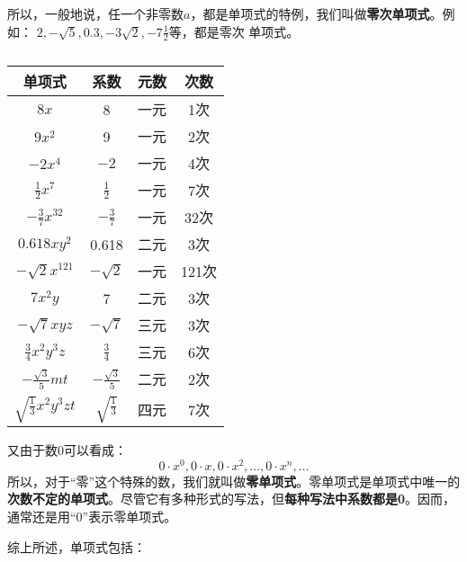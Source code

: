 所以，一般地说，任一个非零数$a$，都是单项式的特例，我们叫做\textbf{零次单项式}。例如：
$2,-\sqrt{5}, 0.3,-3\sqrt{2},-7\frac{1}{2}$等，都是零次
单项式。
\begin{table}
    \caption{}
    \begin{center}
        \begin{tabular}{cccc}
            \hline
            单项式&        系数& 元数&        次数 \\
            \hline
            $8x$& 8& 一元 & 1次\\
            $9x^2$& 9& 一元 & 2次\\
            $-2x^4$& $-2$& 一元 & 4次\\
            $\frac{1}{2}x^7$& $\frac{1}{2}$& 一元 & 7次\\
            $-\frac{3}{7}x^{32}$& $-\frac{3}{7}$& 一元 & 32次\\
            $0.618xy^2$& 0.618 & 二元& 3次  \\
            $-\sqrt{2}x^{121}$& $-\sqrt{2}$ & 一元& 121次     \\
             $7x^2y$ & 7 & 二元& 3次    \\
              $-\sqrt{7}xyz$ & $-\sqrt{7}$ & 三元& 3次     \\
              $\frac{3}{4}x^2y^3z$  & $\frac{3}{4}$ & 三元& 6次   \\
            $-\frac{\sqrt{3}}{5}mt$  & $-\frac{\sqrt{3}}{5}$ & 二元& 2次   \\
            $\sqrt{\frac{1}{3}}x^2y^3zt$  & $\sqrt{\frac{1}{3}}$ & 四元& 7次    \\
            \hline
        \end{tabular}
    \end{center}
\end{table}



又由于数0可以看成：
\[0\cdot x^0, 0\cdot x, 0\cdot x^2, \ldots , 0\cdot x^n, \ldots\]
所以，对于“零”这个特殊的数，我们就叫做\textbf{零单项式}。零单项式是单项式中唯一的\textbf{次数不定的单项式}。尽管它有多种形式的写法，但\textbf{每种写法中系数都是0}。因而，通常还是用“0”表示零单项式。

综上所述，单项式包括：
\begin{center}
\end{center}


